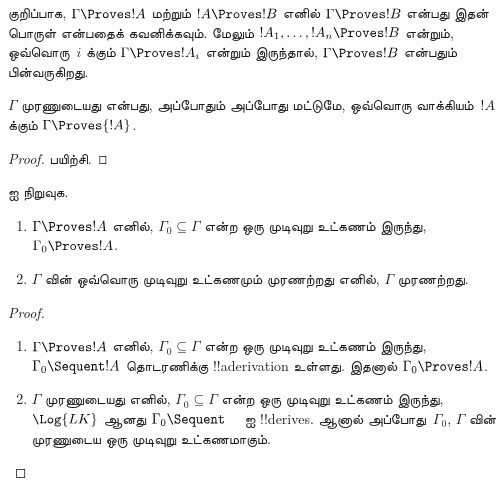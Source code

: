 \documentclass[../../../include/open-logic-section]{subfiles}
\begin{document}
குறிப்பாக, $\Gamma \Proves !A$ மற்றும் $!A \Proves !B$ எனில் $\Gamma
\Proves !B$ என்பது இதன் பொருள் என்பதைக் கவனிக்கவும். மேலும் $!A_1,
\dots, !A_n \Proves !B$ என்றும், ஒவ்வொரு~$i$ க்கும் $\Gamma \Proves !A_i$
என்றும் இருந்தால், $\Gamma \Proves !B$ என்பதும் பின்வருகிறது.

\begin{prop}
$\Gamma$ முரணுடையது என்பது, அப்போதும் அப்போது மட்டுமே, ஒவ்வொரு
வாக்கியம்~$!A$ க்கும் $\Gamma \Proves {!A}$.
\end{prop}

\begin{proof}
பயிற்சி.
\end{proof}

\begin{prob}
 ஐ நிறுவுக.
\end{prob}

\begin{prop}[இறுக்கத்தன்மை]
  \begin{enumerate}
  \item $\Gamma \Proves !A$ எனில், $\Gamma_0 \subseteq \Gamma$ என்ற ஒரு
    முடிவுறு உட்கணம் இருந்து, $\Gamma_0 \Proves !A$.
  \item $\Gamma$ வின் ஒவ்வொரு முடிவுறு உட்கணமும் முரணற்றது எனில்,
    $\Gamma$ முரணற்றது.
  \end{enumerate}
\end{prop}

\begin{proof}
  \begin{enumerate}
    \item $\Gamma \Proves !A$ எனில், $\Gamma_0 \subseteq \Gamma$ என்ற ஒரு
      முடிவுறு உட்கணம் இருந்து, $\Gamma_0 \Sequent !A$ தொடரணிக்கு
      !!a{derivation} உள்ளது. இதனால் $\Gamma_0 \Proves !A$.
    \item $\Gamma$ முரணுடையது எனில், $\Gamma_0 \subseteq \Gamma$ என்ற ஒரு
      முடிவுறு உட்கணம் இருந்து, $\Log{LK}$ ஆனது $\Gamma_0 \Sequent \quad$ ஐ
      !!{derive}s. ஆனால் அப்போது~$\Gamma_0$, $\Gamma$ வின் முரணுடைய ஒரு
      முடிவுறு உட்கணமாகும்.
  \end{enumerate}
\end{proof}
\end{document}
